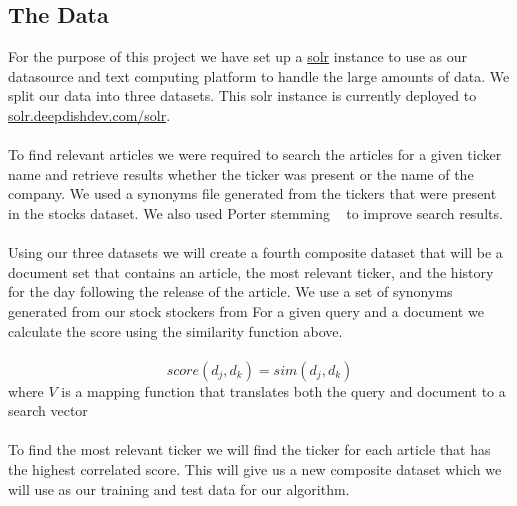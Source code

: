 \documentclass[11pt,letterpaper]{article}
\newcommand{\blue}[1]{\textcolor{RoyalBlue}{#1}}
\newcommand{\instructions}[1]{\blue{\textit{#1}}}
\begin{document}
\subsection{The Data}
\label{sec:data}
For the purpose of this project we have set up a \href{http://lucene.apache.org/solr/}{solr}
instance to use as our datasource and text computing platform to
handle the large amounts of data. We split our data into three datasets.
This solr instance is currently deployed to \href{http://solr.deepdishdev.com:8983/solr}{solr.deepdishdev.com/solr}. \\ \\
To find relevant articles we were required to search the articles
for a given ticker name and retrieve results whether the ticker
was present or the name of the company. We used a synonyms file generated
from the tickers that were present in the stocks dataset. We also used Porter
stemming ~\cite{porter} to improve search results. \\ \\
Using our three datasets we will create a fourth composite dataset that
will be a document set that contains an article, the most relevant ticker,
and the history for the day following the release of the article.
We use a set of synonyms generated from our stock stockers from
For a given query and a document we calculate the score using the similarity function above. \\ \\
\begin{equation}\label{doc:score}
  	score(d_j, d_k) = sim(d_j, d_k)
\end{equation}
where \(V\) is a mapping function that translates both the query and document to a search vector \\ \\
 To find the most relevant ticker we will find the ticker for each article that has the highest correlated score.  This will give us a new composite dataset which we will use as our training and test data for our algorithm.
\end{document}
